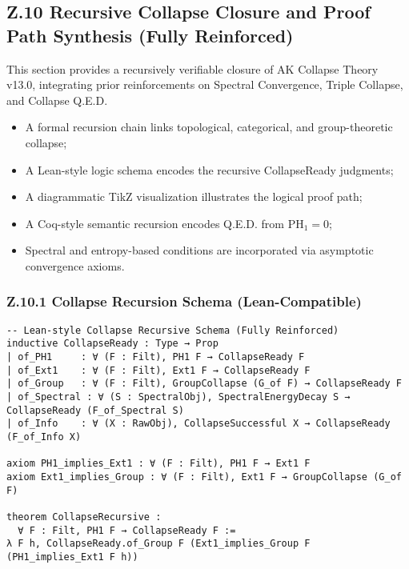 \documentclass[11pt]{article}
\begin{document}

\subsection*{Z.10 Recursive Collapse Closure and Proof Path Synthesis (Fully Reinforced)}

This section provides a recursively verifiable closure of AK Collapse Theory v13.0, integrating prior reinforcements on Spectral Convergence, Triple Collapse, and Collapse Q.E.D.

\begin{itemize}
    \item A formal recursion chain links topological, categorical, and group-theoretic collapse;
    \item A Lean-style logic schema encodes the recursive CollapseReady judgments;
    \item A diagrammatic TikZ visualization illustrates the logical proof path;
    \item A Coq-style semantic recursion encodes Q.E.D. from \( \mathrm{PH}_1 = 0 \);
    \item Spectral and entropy-based conditions are incorporated via asymptotic convergence axioms.
\end{itemize}


\subsubsection*{Z.10.1 Collapse Recursion Schema (Lean-Compatible)}

\begin{lstlisting}[mathescape=false]
-- Lean-style Collapse Recursive Schema (Fully Reinforced)
inductive CollapseReady : Type → Prop
| of_PH1     : ∀ (F : Filt), PH1 F → CollapseReady F
| of_Ext1    : ∀ (F : Filt), Ext1 F → CollapseReady F
| of_Group   : ∀ (F : Filt), GroupCollapse (G_of F) → CollapseReady F
| of_Spectral : ∀ (S : SpectralObj), SpectralEnergyDecay S → CollapseReady (F_of_Spectral S)
| of_Info    : ∀ (X : RawObj), CollapseSuccessful X → CollapseReady (F_of_Info X)

axiom PH1_implies_Ext1 : ∀ (F : Filt), PH1 F → Ext1 F
axiom Ext1_implies_Group : ∀ (F : Filt), Ext1 F → GroupCollapse (G_of F)

theorem CollapseRecursive :
  ∀ F : Filt, PH1 F → CollapseReady F :=
λ F h, CollapseReady.of_Group F (Ext1_implies_Group F (PH1_implies_Ext1 F h))
\end{lstlisting}
\end{document}
